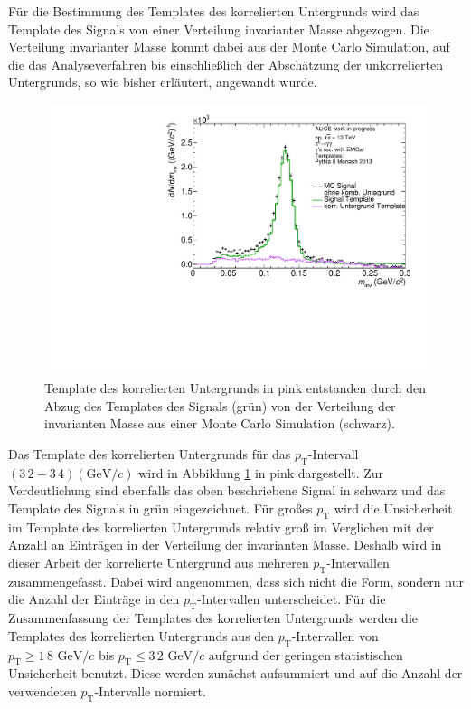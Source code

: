 Für die Bestimmung des Templates des korrelierten Untergrunds wird das Template des Signals von einer Verteilung invarianter Masse abgezogen.
Die Verteilung invarianter Masse kommt dabei aus der Monte Carlo Simulation, auf die das Analyseverfahren bis einschließlich der Abschätzung der unkorrelierten Untergrunds, so wie bisher erläutert, angewandt wurde.
\begin{figure}[tp]
\centering
\includegraphics[width=.75\linewidth]{EntstehungUntergrund10_Data_2016.pdf}
\caption{Template des korrelierten Untergrunds in pink entstanden durch den Abzug des Templates des Signals (grün) von der Verteilung der invarianten Masse aus einer Monte Carlo Simulation (schwarz).}
\label{fig:BkgTemp}
\end{figure}
\newline
Das Template des korrelierten Untergrunds für das $p_\text{T}$-Intervall $(3\,2 - 3\,4) (\text{GeV/}c)$ wird in Abbildung \ref{fig:BkgTemp} in pink dargestellt.
Zur Verdeutlichung sind ebenfalls das oben beschriebene Signal in schwarz und das Template des Signals in grün eingezeichnet.
\newline
Für großes $p_\text{T}$ wird die Unsicherheit im Template des korrelierten Untergrunds relativ groß im Verglichen mit der Anzahl an Einträgen in der Verteilung der invarianten Masse.
Deshalb wird in dieser Arbeit der korrelierte Untergrund aus mehreren $p_\text{T}$-Intervallen zusammengefasst.
Dabei wird angenommen, dass sich nicht die Form, sondern nur die Anzahl der Einträge in den $p_\text{T}$-Intervallen unterscheidet.  
Für die Zusammenfassung der Templates des korrelierten Untergrunds werden die Templates des korrelierten Untergrunds aus den $p_\text{T}$-Intervallen von $p_\text{T} \geq 1\,8\text{ GeV}/c$ bis $p_\text{T} \leq 3\,2\text{ GeV}/c$ aufgrund der geringen statistischen Unsicherheit benutzt.
Diese werden zunächst aufsummiert und auf die Anzahl der verwendeten $p_\text{T}$-Intervalle normiert.

